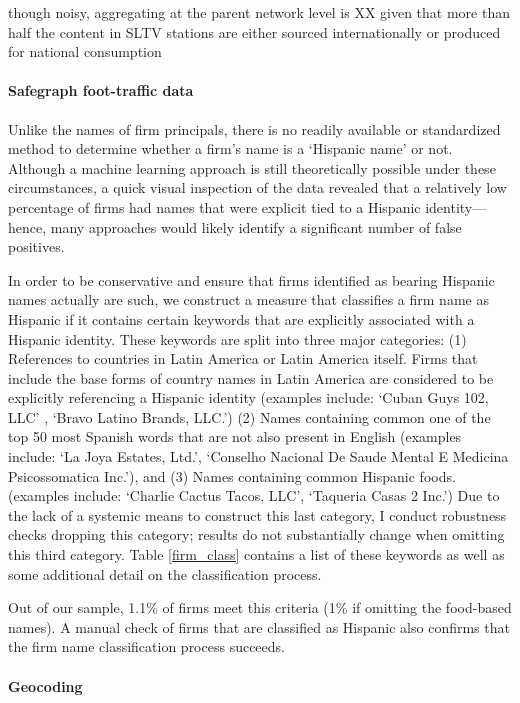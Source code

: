 \documentclass[11pt]{article}
\begin{document}
though noisy, aggregating at the parent network level is XX given that more than half the content in SLTV stations are either sourced internationally or produced for national consumption

\paragraph{Safegraph foot-traffic data}
Unlike the names of firm principals, there is no readily available or standardized method to determine whether a firm's name is a `Hispanic name' or not. Although a machine learning approach is still theoretically possible under these circumstances, a quick visual inspection of the data revealed that a relatively low percentage of firms had names that were explicit tied to a Hispanic identity---hence, many approaches would likely identify a significant number of false positives.

In order to be conservative and ensure that firms identified as bearing Hispanic names actually are such, we construct a measure that classifies a firm name as Hispanic if it contains certain keywords that are explicitly associated with a Hispanic identity. These keywords are split into three major categories: (1) References to countries in Latin America or Latin America itself. Firms that include the base forms of country names in Latin America are considered to be explicitly referencing a Hispanic identity (examples include: `Cuban Guys 102, LLC' , `Bravo Latino Brands, LLC.') (2) Names containing common one of the top 50 most Spanish words that are not also present in English (examples include: `La Joya Estates, Ltd.', `Conselho Nacional De Saude Mental E Medicina Psicossomatica Inc.'), and (3) Names containing common Hispanic foods. (examples include: `Charlie Cactus Tacos, LLC', `Taqueria Casas 2 Inc.') Due to the lack of a systemic means to construct this last category, I conduct robustness checks dropping this category; results do not substantially change when omitting this third category. Table \ref{firm_class} contains a list of these keywords as well as some additional detail on the classification process.

Out of our sample, 1.1\% of firms meet this criteria (1\% if omitting the food-based names). A manual check of firms that are classified as Hispanic also confirms that the firm name classification process succeeds.



\paragraph{Geocoding}
\end{document}
